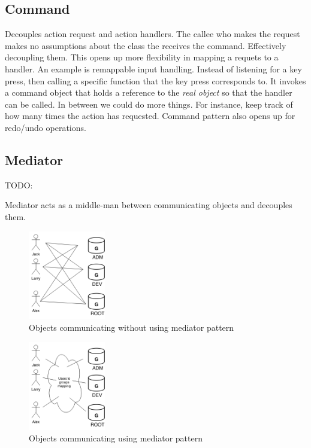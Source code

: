 \documentclass[10pt,letterpaper]{article}
\newcommand{\bs}{\bigskip}
\begin{document}
\begin{multicols}{2}
\subsection{Command}

Decouples action request and action handlers. The callee who makes the request makes no assumptions about the class the receives the command. Effectively decoupling them.
\bs
This opens up more flexibility in mapping a requets to a handler. An example is remappable input handling. Instead of listening for a key press, then calling a specific function that the key press corresponds to. It invokes a command object that holds a reference to the \textit{real object} so that the handler can be called.
\bs
In between we could do more things. For instance, keep track of how many times the action has requested.
\bs
Command pattern also opens up for redo/undo operations.

\subsection{Mediator}\label{ssection:mediator}

TODO:

Mediator acts as a middle-man between communicating objects and decouples them\cite{sm-mediator}.

\begin{figure}[H]
	\centering
	\includegraphics[width=0.3\textwidth]{assets/mediator_before}
	\caption{Objects communicating without using mediator pattern}
	\label{fig:mediator-before}
\end{figure}

\begin{figure}[H]
	\centering
	\includegraphics[width=0.3\textwidth]{assets/mediator_after}
	\caption{Objects communicating using mediator pattern}
	\label{fig:mediator-after}
\end{figure}


\end{multicols}
\end{document}
